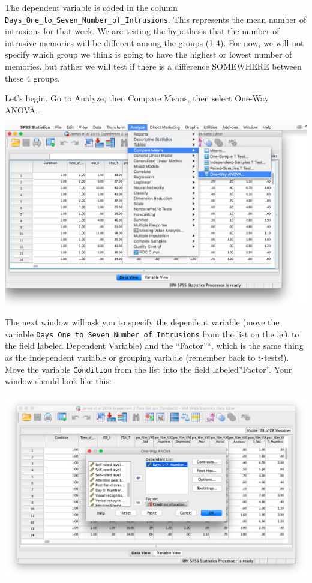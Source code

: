\documentclass[
]{book}
\begin{document}
The dependent variable is coded in the column \texttt{Days\_One\_to\_Seven\_Number\_of\_Intrusions}. This represents the mean number of intrusions for that week. We are testing the hypothesis that the number of intrusive memories will be different among the groups (1-4). For now, we will not specify which group we think is going to have the highest or lowest number of memories, but rather we will test if there is a difference SOMEWHERE between these 4 groups.

Let's begin. Go to {Analyze}, then {Compare Means}, then select {One-Way ANOVA\ldots{}}

\includegraphics{img/8.4.12.png}

The next window will ask you to specify the dependent variable (move the variable \texttt{Days\_One\_to\_Seven\_Number\_of\_Intrusions} from the list on the left to the field labeled Dependent Variable) and the ``Factor''``, which is the same thing as the independent variable or grouping variable (remember back to t-tests!). Move the variable \texttt{Condition} from the list into the field labeled''Factor''. Your window should look like this:

\includegraphics{img/8.4.13.png}
\end{document}
